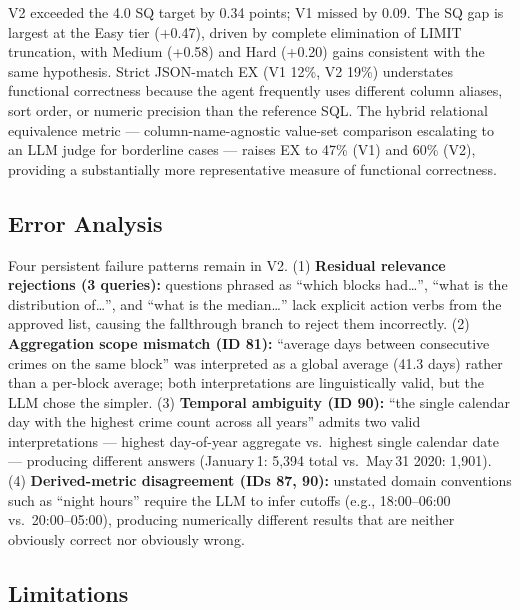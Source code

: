 \documentclass{article}
\begin{document}
V2 exceeded the 4.0 SQ target by 0.34 points; V1 missed by 0.09. The SQ gap is largest at the Easy tier (+0.47), driven by complete elimination of LIMIT truncation, with Medium (+0.58) and Hard (+0.20) gains consistent with the same hypothesis. Strict JSON-match EX (V1 12\%, V2 19\%) understates functional correctness because the agent frequently uses different column aliases, sort order, or numeric precision than the reference SQL. The hybrid relational equivalence metric --- column-name-agnostic value-set comparison escalating to an LLM judge for borderline cases --- raises EX to 47\% (V1) and 60\% (V2), providing a substantially more representative measure of functional correctness.

\subsection{Error Analysis}

Four persistent failure patterns remain in V2. (1) \textbf{Residual relevance rejections (3 queries):} questions phrased as ``which blocks had\ldots'', ``what is the distribution of\ldots'', and ``what is the median\ldots'' lack explicit action verbs from the approved list, causing the fallthrough branch to reject them incorrectly. (2) \textbf{Aggregation scope mismatch (ID 81):} ``average days between consecutive crimes on the same block'' was interpreted as a global average (41.3 days) rather than a per-block average; both interpretations are linguistically valid, but the LLM chose the simpler. (3) \textbf{Temporal ambiguity (ID 90):} ``the single calendar day with the highest crime count across all years'' admits two valid interpretations --- highest day-of-year aggregate vs.\ highest single calendar date --- producing different answers (January\,1: 5,394 total vs.\ May\,31 2020: 1,901). (4) \textbf{Derived-metric disagreement (IDs 87, 90):} unstated domain conventions such as ``night hours'' require the LLM to infer cutoffs (e.g., 18:00--06:00 vs.\ 20:00--05:00), producing numerically different results that are neither obviously correct nor obviously wrong.

\subsection{Limitations}
\end{document}
